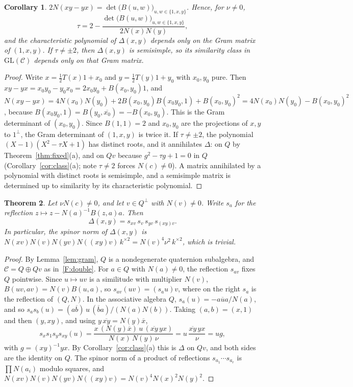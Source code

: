 \documentclass[11pt]{amsart}
\newtheorem{theorem}{Theorem}[section]
\newtheorem{corollary}[theorem]{Corollary}
\theoremstyle{definition}
\theoremstyle{remark}
\newcommand{\C}{\mathcal{C}}
\newcommand{\conj}[1]{\overline{#1}}
\begin{document}
\begin{corollary}\label{cor:classical}
$2N(xy-yx)=\det\bigl(B(u,w)\bigr)_{u,w\in\{1,x,y\}}$. Hence, for $\nu\neq0$,
\[
  \tau=2-\frac{\det\bigl(B(u,w)\bigr)_{u,w\in\{1,x,y\}}}{2N(x)N(y)},
\]
and the characteristic polynomial of $\Delta(x,y)$ depends only on the Gram
matrix of $(1,x,y)$. If $\tau\neq\pm2$, then $\Delta(x,y)$ is semisimple, so
its similarity class in $\mathrm{GL}(\C)$ depends only on that Gram matrix.
\end{corollary}

\begin{proof}
Write $x=\tfrac12T(x)1+x_0$ and $y=\tfrac12T(y)1+y_0$ with $x_0,y_0$ pure.
Then $xy-yx=x_0y_0-y_0x_0=2x_0y_0+B(x_0,y_0)1$, and
$N(xy-yx)=4N(x_0)N(y_0)+2B(x_0,y_0)B(x_0y_0,1)+B(x_0,y_0)^2
=4N(x_0)N(y_0)-B(x_0,y_0)^2$, because $B(x_0y_0,1)=B(y_0,\conj{x_0})=-B(x_0,y_0)$.
This is the Gram determinant of $(x_0,y_0)$. Since $B(1,1)=2$ and $x_0,y_0$ are
the projections of $x,y$ to $1^\perp$, the Gram determinant of $(1,x,y)$ is
twice it. If $\tau\neq\pm2$, the polynomial $(X-1)(X^2-\tau X+1)$ has
distinct roots, and it annihilates $\Delta$: on $Q$ by
Theorem~\ref{thm:fixed}(a), and on $Qv$ because $g^2-\tau g+1=0$ in $Q$
(Corollary~\ref{cor:class}(a); note $\tau\neq2$ forces $N(c)\neq0$). A
matrix annihilated by a polynomial with distinct roots is semisimple, and a
semisimple matrix is determined up to similarity by its characteristic
polynomial.
\end{proof}

\begin{theorem}\label{thm:reflections}
Let $\nu N(c)\neq0$, and let $v\in Q^\perp$ with $N(v)\neq0$. Write $s_a$ for the
reflection $z\mapsto z-N(a)^{-1}B(z,a)a$. Then
\[
  \Delta(x,y)=s_{xv}\,s_v\,s_{yv}\,s_{(xy)v}.
\]
In particular, the spinor norm of $\Delta(x,y)$ is
$N(xv)N(v)N(yv)N((xy)v)\,k^{\times2}=N(v)^4\nu^2\,k^{\times2}$, which is trivial.
\end{theorem}

\begin{proof}
By Lemma~\ref{lem:gram}, $Q$ is a nondegenerate quaternion subalgebra, and
$\C=Q\oplus Qv$ as in~\ref{F:double}. For $a\in Q$ with $N(a)\neq0$, the
reflection $s_{av}$ fixes $Q$ pointwise. Since $u\mapsto uv$ is a similitude
with multiplier $N(v)$, $B(uv,av)=N(v)B(u,a)$, so $s_{av}(uv)=(s_au)v$, where
on the right $s_a$ is the reflection of $(Q,N)$. In the associative algebra
$Q$, $s_a(u)=-a\conj u a/N(a)$, and so
$s_as_b(u)=(a\conj b)\,u\,(\conj ba)/(N(a)N(b))$. Taking $(a,b)=(x,1)$ and
then $(y,xy)$, and using $y\,\conj{xy}=N(y)\conj x$,
\[
  s_xs_1s_ys_{xy}(u)=\frac{x\,(N(y)\conj x)\,u\,(\conj{xy}\,yx)}{N(x)\,N(y)\,\nu}
  =u\,\frac{\conj{xy}\,yx}{\nu}=ug,
\]
with $g=(xy)^{-1}yx$. By Corollary~\ref{cor:class}(a) this is $\Delta$ on
$Qv$, and both sides are the identity on $Q$. The spinor norm of a product of
reflections $s_{a_1}\cdots s_{a_r}$ is $\prod N(a_i)$ modulo squares, and
$N(xv)N(v)N(yv)N((xy)v)=N(v)^4N(x)^2N(y)^2$.
\end{proof}
\end{document}
